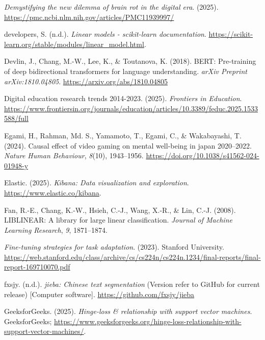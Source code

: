 \documentclass[
  titlepage]{article}
\newlength{\cslhangindent}
\newenvironment{CSLReferences}[2] %
 {\begin{list}{}{%
  \setlength{\itemindent}{0pt}
  \setlength{\leftmargin}{0pt}
  \setlength{\parsep}{0pt}
  \ifodd #1
   \setlength{\leftmargin}{\cslhangindent}
   \setlength{\itemindent}{-1\cslhangindent}
  \fi
  \setlength{\itemsep}{#2\baselineskip}}}
 {\end{list}}
\begin{document}
\begin{CSLReferences}{1}{0}
\emph{Demystifying the new dilemma of brain rot in the digital era}.
(2025). \url{https://pmc.ncbi.nlm.nih.gov/articles/PMC11939997/}

developers, S. (n.d.). \emph{Linear models - scikit-learn
documentation}.
\url{https://scikit-learn.org/stable/modules/linear_model.html}.

Devlin, J., Chang, M.-W., Lee, K., \& Toutanova, K. (2018). BERT:
Pre-training of deep bidirectional transformers for language
understanding. \emph{arXiv Preprint arXiv:1810.04805}.
\url{https://arxiv.org/abs/1810.04805}

Digital education research trends 2014-2023. (2025). \emph{Frontiers in
Education}.
\url{https://www.frontiersin.org/journals/education/articles/10.3389/feduc.2025.1533588/full}

Egami, H., Rahman, Md. S., Yamamoto, T., Egami, C., \& Wakabayashi, T.
(2024). Causal effect of video gaming on mental well-being in japan
2020--2022. \emph{Nature Human Behaviour}, \emph{8}(10), 1943--1956.
\url{https://doi.org/10.1038/s41562-024-01948-y}

Elastic. (2025). \emph{Kibana: Data visualization and exploration}.
\url{https://www.elastic.co/kibana}.

Fan, R.-E., Chang, K.-W., Hsieh, C.-J., Wang, X.-R., \& Lin, C.-J.
(2008). LIBLINEAR: A library for large linear classification.
\emph{Journal of Machine Learning Research}, \emph{9}, 1871--1874.

\emph{Fine-tuning strategies for task adaptation}. (2023). Stanford
University.
\url{https://web.stanford.edu/class/archive/cs/cs224n/cs224n.1234/final-reports/final-report-169710070.pdf}

fxsjy. (n.d.). \emph{{jieba: Chinese text segmentation}} (Version refer
to GitHub for current release) {[}Computer software{]}.
\url{https://github.com/fxsjy/jieba}

GeeksforGeeks. (2025). \emph{Hinge-loss \& relationship with support
vector machines}. GeeksforGeeks;
\url{https://www.geeksforgeeks.org/hinge-loss-relationship-with-support-vector-machines/}.


\end{CSLReferences}
\end{document}
